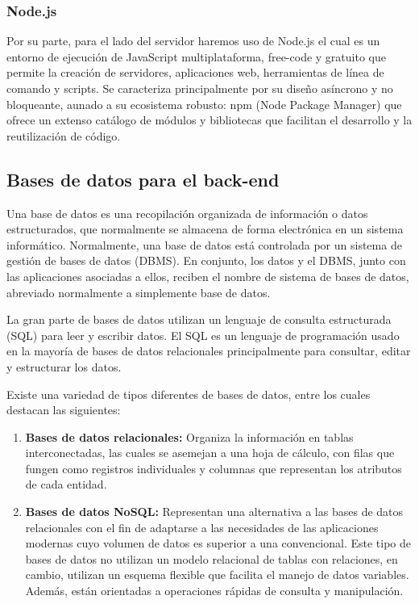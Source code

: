 \documentclass[12pt,a4paper]{report}
\begin{document}
\subsubsection{Node.js}

Por su parte, para el lado del servidor haremos uso de Node.js el cual es un entorno de ejecución de JavaScript multiplataforma, free-code y gratuito que permite la creación de servidores, aplicaciones web, herramientas de línea de comando y scripts. Se caracteriza principalmente por su diseño asíncrono y no bloqueante, aunado a su ecosistema robusto: npm (Node Package Manager) que ofrece un extenso catálogo de módulos y bibliotecas que facilitan el desarrollo y la reutilización de código.

\subsection{Bases de datos para el back-end}

Una base de datos es una recopilación organizada de información o datos estructurados, que normalmente se almacena de forma electrónica en un sistema informático. Normalmente, una base de datos está controlada por un sistema de gestión de bases de datos (DBMS). En conjunto, los datos y el DBMS, junto con las aplicaciones asociadas a ellos, reciben el nombre de sistema de bases de datos, abreviado normalmente a simplemente base de datos.

La gran parte de bases de datos utilizan un lenguaje de consulta estructurada (SQL) para leer y escribir datos. El SQL es un lenguaje de programación usado en la mayoría de bases de datos relacionales principalmente para consultar, editar y estructurar los datos.

Existe una variedad de tipos diferentes de bases de datos, entre los cuales destacan las siguientes:

\begin{enumerate}
\item \textbf{Bases de datos relacionales:} Organiza la información en tablas interconectadas, las cuales se asemejan a una hoja de cálculo, con filas que fungen como registros individuales y columnas que representan los atributos de cada entidad.

\item \textbf{Bases de datos NoSQL:} Representan una alternativa a las bases de datos relacionales con el fin de adaptarse a las necesidades de las aplicaciones modernas cuyo volumen de datos es superior a una convencional. Este tipo de bases de datos no utilizan un modelo relacional de tablas con relaciones, en cambio, utilizan un esquema flexible que facilita el manejo de datos variables. Además, están orientadas a operaciones rápidas de consulta y manipulación.
\end{enumerate}
\end{document}
